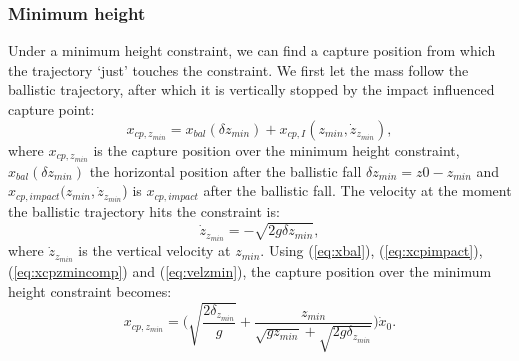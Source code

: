 \documentclass[letterpaper, 10 pt, conference]{ieeeconf}  %
\newcommand{\zmin}{z_{min}}
\begin{document}
\subsubsection{Minimum height} Under a minimum height constraint, we can find a capture position from which the trajectory `just' touches the constraint. We first let the mass follow the ballistic trajectory, after which it is vertically stopped by the impact influenced capture point:
\begin{equation}
	x_{cp,\zmin} = x_{bal}(\delta \zmin) + x_{cp,I}(\zmin, \dot{z}_{\zmin}),
	\label{eq:xcpzmincomp}
\end{equation}
where $x_{cp,\zmin}$ is the capture position over the minimum height constraint, $x_{bal}(\delta \zmin)$ the horizontal position after the ballistic fall $\delta \zmin = z0-\zmin$ and $x_{cp,impact}(\zmin,\dot{z}_{\zmin}$) is $x_{cp,impact}$ after the ballistic fall. The velocity at the moment the ballistic trajectory hits the constraint is:
\begin{equation}
	\dot{z}_{\zmin} = -\sqrt{2g\delta \zmin},
	\label{eq:velzmin}
\end{equation}
where $\dot{z}_{\zmin}$ is the vertical velocity at $z_{min}$. Using (\ref{eq:xbal}), (\ref{eq:xcpimpact}), (\ref{eq:xcpzmincomp}) and (\ref{eq:velzmin}), the capture position over the minimum height constraint becomes:
\begin{equation}
	x_{cp,\zmin} = \Bigg(\sqrt{\frac{2\delta_{z_{min}}}{g}} + \frac{\zmin}{\sqrt{g \zmin}+\sqrt{2g\delta_{\zmin}}}\Bigg)\dot{x}_0.
\end{equation}
\end{document}
